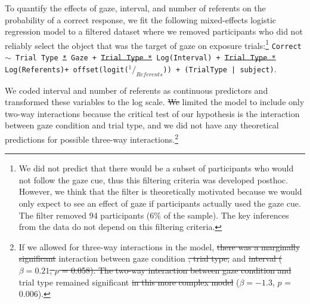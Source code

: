 \documentclass[authoryear, review]{elsarticle}
\providecommand{\DIFaddtex}[1]{{\protect\color{blue}\uwave{#1}}} %
\providecommand{\DIFdeltex}[1]{{\protect\color{red}\sout{#1}}}                      %
\providecommand{\DIFaddbegin}{} %
\providecommand{\DIFaddend}{} %
\providecommand{\DIFdelbegin}{} %
\providecommand{\DIFdelend}{} %
\providecommand{\DIFadd}[1]{\texorpdfstring{\DIFaddtex{#1}}{#1}} %
\providecommand{\DIFdel}[1]{\texorpdfstring{\DIFdeltex{#1}}{}} %
\begin{document}
To quantify the effects of gaze, interval, and number of referents on
the probability of a correct response, we fit the following
mixed-effects logistic regression model to a filtered dataset where we
removed participants who did not reliably select the object that was the
target of gaze on exposure trials:\footnote{We did not predict that
  there would be a subset of participants who would not follow the gaze
  cue, thus this filtering criteria was developed posthoc. However, we
  think that the filter is theoretically motivated because we would only
  expect to see an effect of gaze if participants actually used the gaze
  cue. The filter removed 94 participants (6\% of the sample). The key
  inferences from the data do not depend on this filtering criteria.}
\texttt{Correct $\sim$ \DIFaddbegin \DIFadd{(}\DIFaddend Trial Type \DIFdelbegin \DIFdel{* }\DIFdelend \DIFaddbegin \DIFadd{+ }\DIFaddend Gaze + \DIFdelbegin \DIFdel{Trial Type * }\DIFdelend Log(Interval) + \DIFdelbegin \DIFdel{Trial Type * }%
\DIFdelend Log(Referents)\DIFaddbegin \DIFadd{)$^2$ }\DIFaddend + offset(logit($^1/_{Referents}$)) + (TrialType | subject)}.
\DIFdelbegin %

\DIFdelend We coded interval and number of referents as continuous predictors and
transformed these variables to the log scale. \DIFdelbegin \DIFdel{We }\DIFdelend \DIFaddbegin \DIFadd{And we }\DIFaddend limited the model
to include only two-way interactions because the critical test of our
hypothesis is the interaction between gaze condition and trial type, and
we did not have any theoretical predictions for possible three-way
interactions.\footnote{If we allowed for three-way interactions in the
  model, \DIFdelbegin \DIFdel{there was a marginally significant }\DIFdelend \DIFaddbegin \DIFadd{the key }\DIFaddend interaction between gaze condition \DIFdelbegin \DIFdel{, trial type, }\DIFdelend and \DIFdelbegin \DIFdel{interval ($\beta = 0.21$, $p$ = 0.058). The two-way interaction between gaze condition and }\DIFdelend trial type
  remained significant \DIFdelbegin \DIFdel{in this more complex model }\DIFdelend (\DIFdelbegin \DIFdel{$\beta = -1.3$}\DIFdelend \DIFaddbegin \DIFadd{\(\beta\) = -1.3}\DIFaddend , \DIFdelbegin \DIFdel{$p$ }\DIFdelend \DIFaddbegin \DIFadd{\(p\) }\DIFaddend = 0.006).}
\end{document}
